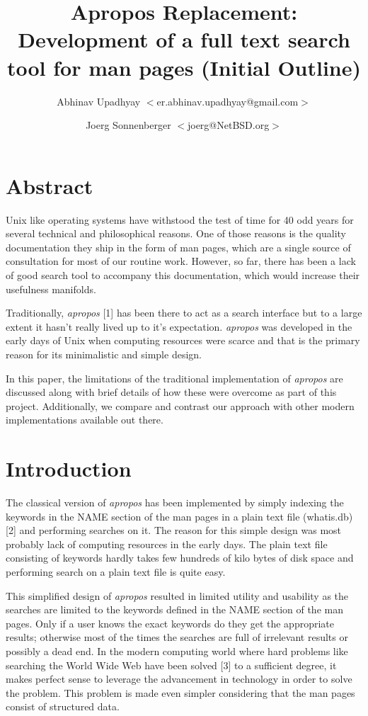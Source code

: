 \documentclass[titlepage, a4paper, 12pt]{article}
\title{Apropos Replacement: Development of a full text search tool for man pages \newline
(Initial Outline)}
\author{Abhinav Upadhyay $<$er.abhinav.upadhyay@gmail.com$>$ \and 
Joerg Sonnenberger $<$joerg@NetBSD.org$>$}
\begin{document}
\maketitle
\section{Abstract}
Unix like operating systems have withstood the test of time for 40 odd years for
several technical and philosophical reasons. One of those reasons is the
quality documentation they ship in the form of man pages, which are a single
source of consultation for most of our routine work. However, so far, there has been a lack of
good search tool to accompany this documentation, which would increase their
usefulness manifolds.

Traditionally, \textit{apropos} [1] has been there to act as a search
interface but to a large extent it hasn't really lived up to it's expectation.
\textit{apropos} was
developed in the early days of Unix when computing resources were scarce and
that is the primary reason for its minimalistic and simple design.

In this paper, the limitations of the traditional implementation of
\textit{apropos} are discussed along with brief details of how these were overcome as part of this project.
Additionally, we compare and contrast our approach with other modern implementations available out there.

\section{Introduction}
The classical version of \textit{apropos} has been implemented by simply
indexing the keywords in the NAME section of the man pages in a plain text file
(whatis.db) [2]
and performing searches on it. The reason for this simple design was most
probably lack of computing resources in the early days. The plain text file
consisting of keywords hardly takes few hundreds of kilo bytes of disk space
and performing search on a plain text file is quite easy.

This simplified design of \textit{apropos} resulted in limited utility and
usability as the searches are limited to the keywords defined in the NAME
section of the man pages. Only if a user knows the exact keywords do they get
the appropriate results; otherwise most of
the times the searches are full of irrelevant results or possibly a dead end. In the modern
computing world where hard problems like searching the World Wide Web have been
solved [3] to a sufficient degree, it makes perfect sense to leverage the
advancement in technology in order to solve the problem. This problem is made
even simpler considering that the man pages consist of structured data.
\end{document}
